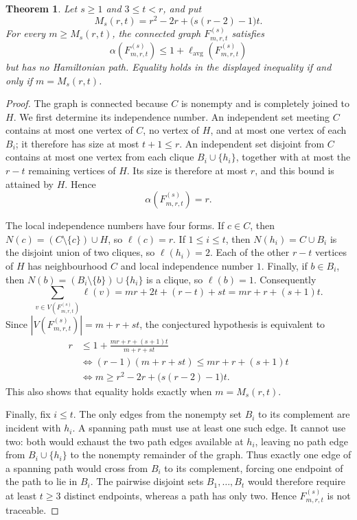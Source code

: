 \documentclass[10pt,a4paper]{amsart}
\newtheorem{theorem}{Theorem}
\newcommand{\lavg}{\ell_{\mathrm{avg}}}
\begin{document}
\begin{theorem}\label{thm:family}
Let $s\geq 1$ and $3\leq t<r$, and put
\[
  M_s(r,t)=r^2-2r+\bigl(s(r-2)-1\bigr)t.
\]
For every $m\geq M_s(r,t)$, the connected graph $F^{(s)}_{m,r,t}$ satisfies
\[
  \alpha(F^{(s)}_{m,r,t})\leq 1+\lavg(F^{(s)}_{m,r,t})
\]
but has no Hamiltonian path.  Equality holds in the displayed inequality if and only if
$m=M_s(r,t)$.
\end{theorem}

\begin{proof}
The graph is connected because $C$ is nonempty and is completely joined to $H$.
We first determine its independence number.  An independent set meeting $C$ contains
at most one vertex of $C$, no vertex of $H$, and at most one vertex of each $B_i$; it
therefore has size at most $t+1\leq r$.  An independent set disjoint from $C$ contains at
most one vertex from each clique $B_i\cup\{h_i\}$, together with at most the $r-t$
remaining vertices of $H$.  Its size is therefore at most $r$, and this bound is attained
by $H$.  Hence
\[
  \alpha(F^{(s)}_{m,r,t})=r.
\]

The local independence numbers have four forms.  If $c\in C$, then
$N(c)=(C\setminus\{c\})\cup H$, so $\ell(c)=r$.  If $1\leq i\leq t$, then
$N(h_i)=C\cup B_i$ is the disjoint union of two cliques, so $\ell(h_i)=2$.  Each of the
other $r-t$ vertices of $H$ has neighbourhood $C$ and local independence number $1$.
Finally, if $b\in B_i$, then $N(b)=(B_i\setminus\{b\})\cup\{h_i\}$ is a clique, so
$\ell(b)=1$.  Consequently
\begin{equation}\label{eq:localsum}
  \sum_{v\in V(F^{(s)}_{m,r,t})}\ell(v)
  =mr+2t+(r-t)+st
  =mr+r+(s+1)t.
\end{equation}
Since $|V(F^{(s)}_{m,r,t})|=m+r+st$, the conjectured hypothesis is equivalent to
\begin{align*}
  r
  &\leq 1+\frac{mr+r+(s+1)t}{m+r+st}\\
  &\Longleftrightarrow
  (r-1)(m+r+st)\leq mr+r+(s+1)t\\
  &\Longleftrightarrow
  m\geq r^2-2r+\bigl(s(r-2)-1\bigr)t.
\end{align*}
This also shows that equality holds exactly when $m=M_s(r,t)$.

Finally, fix $i\leq t$.  The only edges from the nonempty set $B_i$ to its complement are
incident with $h_i$.  A spanning path must use at least one such edge.  It cannot use two:
both would exhaust the two path edges available at $h_i$, leaving no path edge from
$B_i\cup\{h_i\}$ to the nonempty remainder of the graph.  Thus exactly one edge of a
spanning path would cross from $B_i$ to its complement, forcing one endpoint of the path
to lie in $B_i$.  The pairwise disjoint sets $B_1,\dots,B_t$ would therefore require at
least $t\geq 3$ distinct endpoints, whereas a path has only two.  Hence
$F^{(s)}_{m,r,t}$ is not traceable.
\end{proof}
\end{document}
